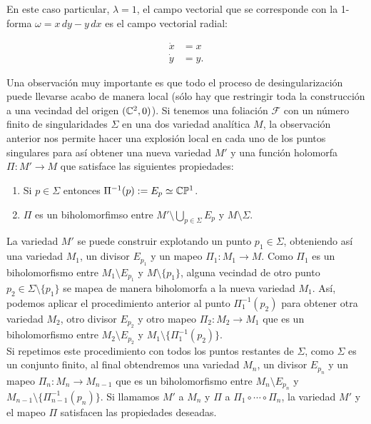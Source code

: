 En este caso particular, $\lambda=1$, el campo vectorial que se corresponde con la 1-forma $\omega=x\, dy-y\, dx$ es el campo vectorial radial:

\begin{equation}
\begin{aligned}
\dot{x}&=x\\
\dot{y}&=y.
\end{aligned}
\end{equation}

Una observación muy importante es que todo el proceso de desingularización puede llevarse acabo de manera local (sólo hay que restringir toda la construcción a una vecindad del origen $(\mathbb{C}^{2},0)$). Si tenemos una foliación $\mathcal{F}$ con un número finito de singularidades $\Sigma$ en una dos variedad analítica $M$, la observación anterior nos permite hacer una explosión local en cada uno de los puntos singulares para así obtener una nueva variedad $M'$ y una función holomorfa $\Pi\colon M' \rightarrow M$ que satisface las siguientes propiedades:

\begin{enumerate}
\item Si $p\in\Sigma$ entonces $\Pi^{-1}(p):=E_{p}\simeq\mathbb{C}\mathbb{P}^{1}$.
\item $\Pi$ es un biholomorfimso entre $M'\setminus \bigcup_{p\in\Sigma} E_{p}$ y $M\setminus\Sigma$.
\end{enumerate}

La variedad $M'$ se puede construir explotando un punto $p_{1}\in\Sigma$, obteniendo así una variedad $M_{1}$, un divisor $E_{p_{1}}$ y un mapeo $\Pi_{1}\colon M_{1}\rightarrow M$. Como $\Pi_{1}$ es un biholomorfismo entre $M_{1}\setminus E_{p_{1}}$ y $M\setminus \{p_{1}\}$, alguna vecindad de otro punto $p_{2}\in\Sigma\setminus \{p_{1}\}$ se mapea de manera biholomorfa a la nueva variedad $M_{1}$. Así, podemos aplicar el procedimiento anterior al punto $\Pi^{-1}_{1}(p_{2})$ para obtener otra variedad $M_{2}$, otro divisor $E_{p_{2}}$ y otro mapeo $\Pi_{2}\colon M_{2}\rightarrow M_{1}$ que es un biholomorfismo entre $M_{2}\setminus E_{p_{2}}$ y $M_{1}\setminus \{\Pi^{-1}_{1}(p_{2})\}$.\\ 

Si repetimos este procedimiento con todos los puntos restantes de $\Sigma$, como $\Sigma$ es un conjunto finito, al final obtendremos una variedad $M_{n}$, un divisor $E_{p_{n}}$ y un mapeo $\Pi_{n}\colon M_{n}\rightarrow M_{n-1}$ que es un biholomorfismo entre $M_{n}\setminus E_{p_{n}}$ y $M_{n-1}\setminus \{\Pi^{-1}_{n-1}(p_{n})\}$. Si llamamos $M'$ a $M_{n}$ y $\Pi$ a $\Pi_{1}\circ\cdots\circ\Pi_{n}$, la variedad $M'$ y el mapeo $\Pi$ satisfacen las propiedades deseadas.   
 
